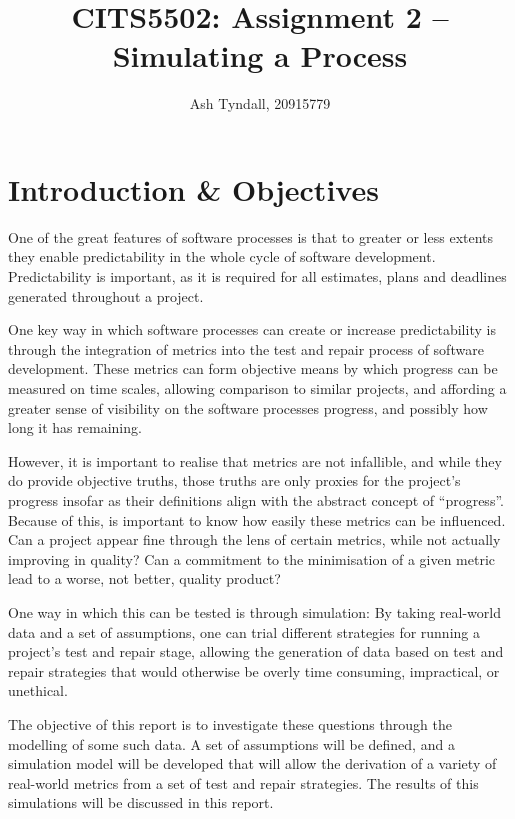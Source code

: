 \documentclass[a4paper,10pt]{article}
\title{CITS5502: Assignment 2 -- Simulating a Process}
\author{Ash Tyndall, 20915779}
\begin{document}
\pagestyle{fancy}
\maketitle
\tableofcontents

\clearpage
\section{Introduction \& Objectives}
One of the great features of software processes is that to greater or less extents they enable predictability in the whole cycle of software development. Predictability is important, as it is required for all estimates, plans and deadlines generated throughout a project.

One key way in which software processes can create or increase predictability is through the integration of metrics into the test and repair process of software development. These metrics can form objective means by which progress can be measured on time scales, allowing comparison to similar projects, and affording a greater sense of visibility on the software processes progress, and possibly how long it has remaining.

However, it is important to realise that metrics are not infallible, and while they do provide objective truths, those truths are only proxies for the project's progress insofar as their definitions align with the abstract concept of ``progress''. Because of this, is important to know how easily these metrics can be influenced. Can a project appear fine through the lens of certain metrics, while not actually improving in quality? Can a commitment to the minimisation of a given metric lead to a worse, not better, quality product? 

One way in which this can be tested is through simulation: By taking real-world data and a set of assumptions, one can trial different strategies for running a project's test and repair stage, allowing the generation of data based on test and repair strategies that would otherwise be overly time consuming, impractical, or unethical.

The objective of this report is to investigate these questions through the modelling of some such data. A set of assumptions will be defined, and a simulation model will be developed that will allow the derivation of a variety of real-world metrics from a set of test and repair strategies. The results of this simulations will be discussed in this report.
\end{document}
